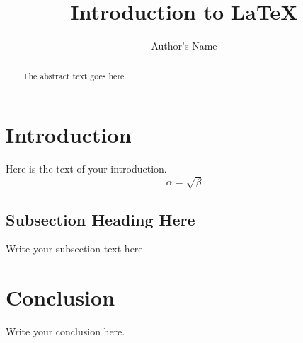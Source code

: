 \documentclass{article}
\begin{document}
\title{Introduction to \LaTeX{}}
\author{Author's Name}

\maketitle

\begin{abstract}
The abstract text goes here.
\end{abstract}

\section{Introduction}
Here is the text of your introduction.
\begin{equation}
    \label{simple_equation}
    \alpha = \sqrt{ \beta }
\end{equation}

\subsection{Subsection Heading Here}
Write your subsection text here.

\section{Conclusion}
Write your conclusion here.
\end{document}
